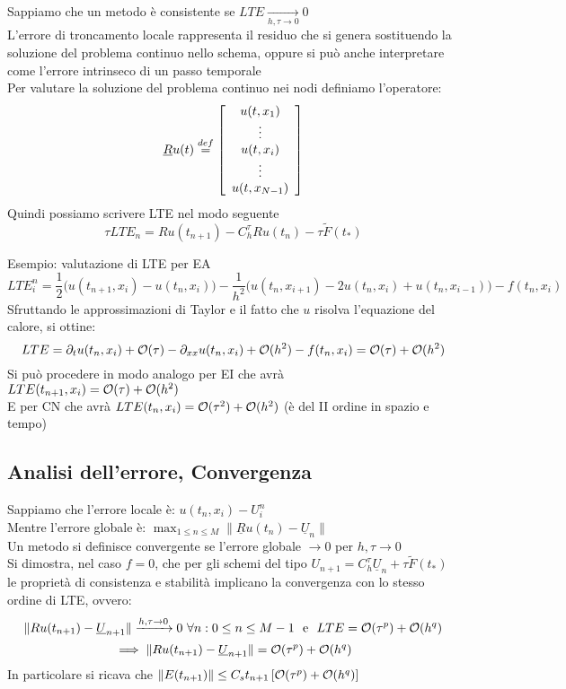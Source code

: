 \documentclass{article}
\renewcommand{\vv}[1]{\underline{#1}}
\begin{document}
Sappiamo che un metodo è consistente se $LTE\xrightarrow[h,\tau\to0]{}0$\\
L'errore di troncamento locale rappresenta il residuo che si genera sostituendo la soluzione del problema continuo nello schema, oppure si può anche interpretare come l'errore intrinseco di un passo temporale\\

Per valutare la soluzione del problema continuo nei nodi definiamo l'operatore:
\[
\vv{R}u(t) \overset{def}{=} \OO \begin{array}{c} u(t,x_1) \\ \vdots \\ u(t,x_i) \\ \vdots \\ u(t,x_{N-1}) \end{array} \CC
\]
Quindi possiamo scrivere LTE nel modo seguente
\[
\tau LTE_{n}=Ru(t_{n+1})-C_h^{\tau} Ru(t_n)-\tau \tilde{F}(t_*)
\]

Esempio: valutazione di LTE per EA
\[
LTE_i^n = \frac12 \big(u(t_{n+1},x_i)-u(t_n,x_i)\big) - \frac{1}{h^2} \big(u(t_n,x_{i+1}) - 2u(t_n,x_i) +u(t_n,x_{i-1})\big) - f(t_n,x_i) 
\]
Sfruttando le approssimazioni di Taylor e il fatto che $u$ risolva l'equazione del calore, si ottine:
\[
LTE = \partial_t u(t_n,x_i) + \mathcal O(\tau) - \partial_{xx}u(t_n,x_i) + \mathcal O(h^2) - f(t_n,x_i) = \mathcal O(\tau) + \mathcal O(h^2)
\]
Si può procedere in modo analogo per EI che avrà $LTE(t_{n+1},x_i)=\mathcal O(\tau) + \mathcal O(h^2)$\\
E per CN che avrà $LTE(t_n,x_i)=\mathcal O(\tau^2) + \mathcal O(h^2)$ (è del II ordine in spazio e tempo)\\



\subsection{Analisi dell'errore, Convergenza}

Sappiamo che l'errore locale è: $u(t_n,x_i)-U_i^n$\\
Mentre l'errore globale è: $\displaystyle \max_{1\le n\le M} \|\vv{R}u(t_n)-\vv{U}_n\|$\\
Un metodo si definisce convergente se l'errore globale $\to 0$ per $h,\tau \to 0$\\

Si dimostra, nel caso $f=0$, che per gli schemi del tipo $U_{n+1}=C_h^{\tau} \vv{U}_n +\tau \tilde{F}(t_*)$ le proprietà di consistenza e stabilità implicano la convergenza con lo stesso ordine di LTE, ovvero:
\[
\|Ru(t_{n+1})-\vv{U}_{n+1}\|\xrightarrow{h,\tau\to 0}0 \ \forall n: 0\le n\le M-1 \ \text{ e } \ LTE = \Oc(\tau^p)+\Oc(h^q)
\]
\[
\implies \|Ru(t_{n+1})-\vv{U}_{n+1}\|=\Oc(\tau^p)+\Oc(h^q)
\]
In particolare si ricava che $\|E(t_{n+1})\|\le C_s t_{n+1}\left[\mathcal O(\tau^p)+\mathcal O(h^q)\right]$\\
\end{document}
